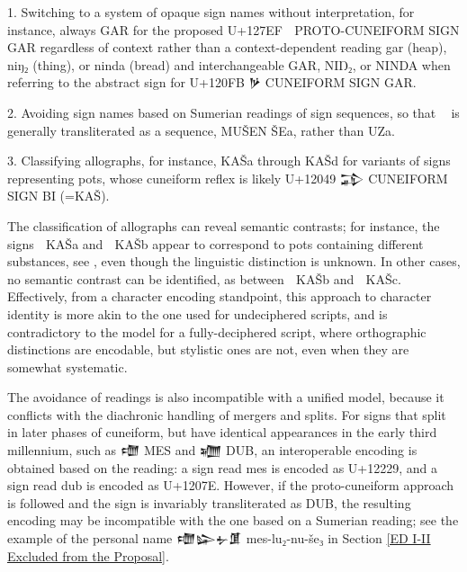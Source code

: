 1. Switching to a system of opaque sign names without interpretation,
for instance, always GAR for the proposed U+127EF 𒟯 PROTO-CUNEIFORM
SIGN GAR regardless of context rather than a context-dependent reading
gar (heap), niŋ₂ (thing), or ninda (bread) and interchangeable GAR,
NIŊ₂, or NINDA when referring to the abstract sign for U+120FB 𒃻
CUNEIFORM SIGN GAR.

2. Avoiding sign names based on Sumerian readings of sign sequences,
so that 𒤡𒨟 is generally transliterated as a sequence, MUŠEN ŠEa,
rather than UZa.

3. Classifying allographs, for instance, KAŠa through KAŠd for
variants of signs representing pots, whose cuneiform reflex is likely
U+12049 𒁉 CUNEIFORM SIGN BI (=KAŠ).

The classification of allographs can reveal semantic contrasts; for
instance, the signs 𒢄 KAŠa and 𒢅 KAŠb appear to correspond to pots
containing different substances, see \cite[168]{OBO160/1}, even though
the linguistic distinction is unknown. In other cases, no semantic
contrast can be identified, as between 𒢅 KAŠb and 𒢇 KAŠc. Effectively,
from a character encoding standpoint, this approach to character
identity is more akin to the one used for undeciphered scripts, and is
contradictory to the model for a fully-deciphered script, where
orthographic distinctions are encodable, but stylistic ones are not,
even when they are somewhat systematic.

The avoidance of readings is also incompatible with a unified model,
because it conflicts with the diachronic handling of mergers and
splits. For signs that split in later phases of cuneiform, but have
identical appearances in the early third millennium, such as 𒈩 MES and
𒁾 DUB, an interoperable encoding is obtained based on the reading: a
sign read mes is encoded as U+12229, and a sign read dub is encoded as
U+1207E. However, if the proto-cuneiform approach is followed and the
sign is invariably transliterated as DUB, the resulting encoding may
be incompatible with the one based on a Sumerian reading; see the
example of the personal name 𒈩𒇽𒉡𒂠 mes-lu₂-nu-še₃ in Section \ref{ED
I-II Excluded from the Proposal}.

